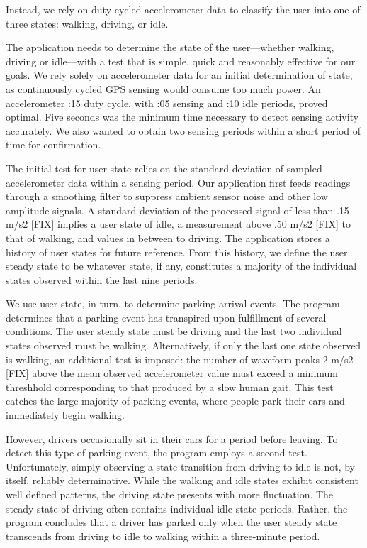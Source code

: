 Instead, we rely on duty-cycled accelerometer data to classify the user into
one of three states: walking, driving, or idle.

The application needs to determine the state of the user---whether walking,
driving or idle---with a test that is simple, quick and reasonably effective
for our goals. We rely solely on accelerometer data for an initial
determination of state, as continuously cycled GPS sensing would consume too
much power. An accelerometer :15 duty cycle, with :05 sensing and :10 idle
periods, proved optimal. Five seconds was the minimum time necessary to
detect sensing activity accurately. We also wanted to obtain two sensing
periods within a short period of time for confirmation.

The initial test for user state relies on the standard deviation of sampled
accelerometer data within a sensing period.  Our application first feeds
readings through a smoothing filter to suppress ambient sensor noise
and other low amplitude signals.  A standard deviation of the processed
signal of less than .15 m/s2 [FIX] implies a user state of idle, a measurement
above .50 m/s2 [FIX] to that of walking, and values in between to driving. The
application stores a history of user states for future reference. From this
history, we define the user steady state to be whatever state, if any,
constitutes a majority of the individual states observed within the last
nine periods.

We use user state, in turn, to determine parking arrival events. The program
determines that a parking event has transpired upon fulfillment of several
conditions.  The user steady state must be driving and the last two
individual states observed must be walking.  Alternatively, if only the last
one state observed is walking, an additional test is imposed:  the number of
waveform peaks 2 m/s2 [FIX] above the mean observed accelerometer value must
exceed a minimum threshhold corresponding to that produced by a slow human
gait.  This test catches the large majority of parking events, where people
park their cars and immediately begin walking.

However, drivers occasionally sit in their cars for a period before leaving.
To detect this type of parking event, the program employs a second test.
Unfortunately, simply observing a state transition from driving to idle is
not, by itself, reliably determinative.  While the walking and idle states
exhibit consistent well defined patterns, the driving state presents with
more fluctuation.  The steady state of driving often contains individual
idle state periods.  Rather, the program concludes that a driver has parked
only when the user steady state transcends from driving to idle to walking
within a three-minute period.

